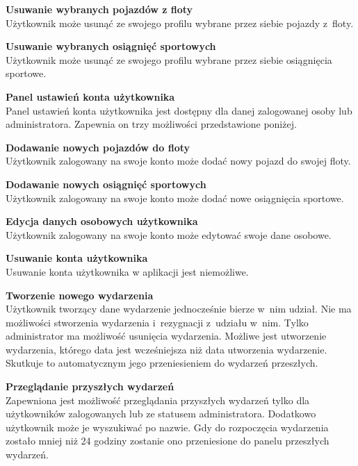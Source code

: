 \documentclass[../Kamil_Kowalewski_Main.tex]{subfiles}
\begin{document}
{{{            \noindent\textbf{Usuwanie wybranych pojazdów z floty}\\
            \indent Użytkownik może usunąć ze swojego profilu wybrane przez siebie pojazdy
            z~floty.

            \noindent\textbf{Usuwanie wybranych osiągnięć sportowych}\\
            \indent Użytkownik może usunąć ze swojego profilu wybrane przez siebie osiągnięcia
            sportowe.

            \noindent\textbf{Panel ustawień konta użytkownika}\\
            \indent Panel ustawień konta użytkownika jest dostępny dla danej zalogowanej
            osoby lub administratora. Zapewnia on trzy możliwości przedstawione poniżej.

            \noindent\textbf{Dodawanie nowych pojazdów do floty}\\
            \indent Użytkownik zalogowany na swoje konto może dodać nowy pojazd do
            swojej floty.

            \noindent\textbf{Dodawanie nowych osiągnięć sportowych}\\
            \indent Użytkownik zalogowany na swoje konto może dodać nowe
            osiągnięcia sportowe.

            \noindent\textbf{Edycja danych osobowych użytkownika}\\
            \indent Użytkownik zalogowany na swoje konto może edytować swoje
            dane osobowe.

            \noindent\textbf{Usuwanie konta użytkownika}\\
            \indent Usuwanie konta użytkownika w aplikacji jest niemożliwe.

            \noindent\textbf{Tworzenie nowego wydarzenia}\\
            \indent Użytkownik tworzący dane wydarzenie jednocześnie bierze w~nim
            udział. Nie ma możliwości stworzenia wydarzenia i~rezygnacji z~udziału
            w~nim. Tylko administrator ma możliwość usunięcia wydarzenia. Możliwe jest
            utworzenie wydarzenia, którego data jest wcześniejsza niż data utworzenia
            wydarzenie. Skutkuje to automatycznym jego przeniesieniem do wydarzeń
            przeszłych.

            \noindent\textbf{Przeglądanie przyszłych wydarzeń}\\
            \indent Zapewniona jest możliwość przeglądania przyszłych wydarzeń tylko
            dla użytkowników zalogowanych lub ze statusem administratora. Dodatkowo
            użytkownik może je wyszukiwać po nazwie. Gdy do rozpoczęcia wydarzenia
            zostało mniej niż 24 godziny zostanie ono przeniesione do panelu przeszłych
            wydarzeń.

}}}
\end{document}
